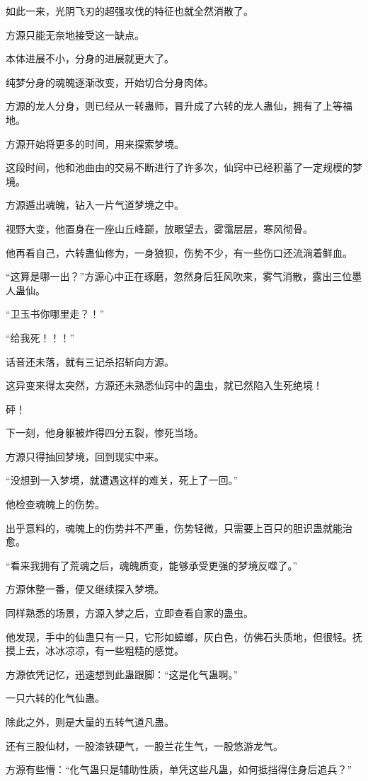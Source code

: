 \begin{this_body}
如此一来，光阴飞刃的超强攻伐的特征也就全然消散了。

方源只能无奈地接受这一缺点。

本体进展不小，分身的进展就更大了。

纯梦分身的魂魄逐渐改变，开始切合分身肉体。

方源的龙人分身，则已经从一转蛊师，晋升成了六转的龙人蛊仙，拥有了上等福地。

方源开始将更多的时间，用来探索梦境。

这段时间，他和池曲由的交易不断进行了许多次，仙窍中已经积蓄了一定规模的梦境。

方源遁出魂魄，钻入一片气道梦境之中。

视野大变，他置身在一座山丘峰巅，放眼望去，雾霭层层，寒风彻骨。

他再看自己，六转蛊仙修为，一身狼狈，伤势不少，有一些伤口还流淌着鲜血。

“这算是哪一出？”方源心中正在琢磨，忽然身后狂风吹来，雾气消散，露出三位墨人蛊仙。

“卫玉书你哪里走？！”

“给我死！！！”

话音还未落，就有三记杀招斩向方源。

这异变来得太突然，方源还未熟悉仙窍中的蛊虫，就已然陷入生死绝境！

砰！

下一刻，他身躯被炸得四分五裂，惨死当场。

方源只得抽回梦境，回到现实中来。

“没想到一入梦境，就遭遇这样的难关，死上了一回。”

他检查魂魄上的伤势。

出乎意料的，魂魄上的伤势并不严重，伤势轻微，只需要上百只的胆识蛊就能治愈。

“看来我拥有了荒魂之后，魂魄质变，能够承受更强的梦境反噬了。”

方源休整一番，便又继续探入梦境。

同样熟悉的场景，方源入梦之后，立即查看自家的蛊虫。

他发现，手中的仙蛊只有一只，它形如蟑螂，灰白色，仿佛石头质地，但很轻。抚摸上去，冰冰凉凉，有一些粗糙的感觉。

方源依凭记忆，迅速想到此蛊跟脚：“这是化气蛊啊。”

一只六转的化气仙蛊。

除此之外，则是大量的五转气道凡蛊。

还有三股仙材，一股漆铁硬气，一股兰花生气，一股悠游龙气。

方源有些懵：“化气蛊只是辅助性质，单凭这些凡蛊，如何抵挡得住身后追兵？”


\end{this_body}
